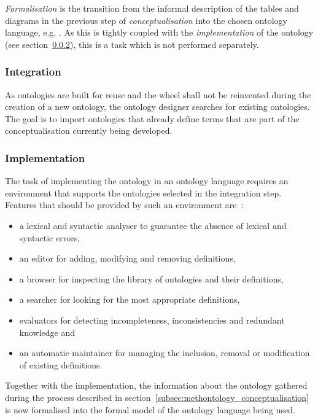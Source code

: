\emph{Formalisation} is the transition from the informal description of the tables and diagrams in the previous step of \emph{conceptualisation} into the chosen ontology language, e.g. . As this is tightly coupled with the \emph{implementation} of the ontology (see section~\ref{subsec:methontology_implementation}), this is a task which is not performed separately.

\subsubsection{Integration}

As ontologies are built for reuse and the wheel shall not be reinvented during the creation of a new ontology, the ontology designer searches for existing ontologies. The goal is to import ontologies that already define terms that are part of the conceptualisation currently being developed.

\subsubsection{Implementation}
\label{subsec:methontology_implementation}

The task of implementing the ontology in an ontology language requires an environment that supports the ontologies selected in the integration step. Features that should be provided by such an environment are~\cite{Methontology}:

\begin{itemize}
  \item a lexical and syntactic analyser to guarantee the absence of lexical and syntactic errors,
  \item an editor for adding, modifying and removing definitions,
  \item a browser for inspecting the library of ontologies and their definitions,
  \item a searcher for looking for the most appropriate definitions,
  \item evaluators for detecting incompleteness, inconsistencies and redundant knowledge and
  \item an automatic maintainer for managing the inclusion, removal or modification of existing definitions.
\end{itemize}

Together with the implementation, the information about the ontology gathered during the process described in section~\ref{subsec:methontology_conceptualisation} is now formalised into the formal model of the ontology language being used.

